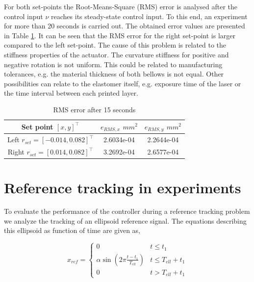 For both set-points the Root-Means-Square (RMS) error is analysed after the control input $\nu$ reaches its steady-state control input. To this end, an experiment for more than 20 seconds is carried out. The obtained error values are presented in Table \ref{tab:RMSerrors}. It can be seen that the RMS error for the right set-point is larger compared to the left set-point. The cause of this problem is related to the stiffness properties of the actuator. The curvature stiffness for positive and negative rotation is not uniform. This could be related to manufacturing tolerances, e.g. the material thickness of both bellows is not equal. Other possibilities can relate to the elastomer itself, e.g. exposure time of the laser or the time interval between each printed layer. 



\begin{table}[H]
    \centering
    \caption{RMS error after 15 seconds}
    \begin{tabular}{|c|c|c|} \hline
     Set point $[x,y]^\top$    & $e_{RMS,x}$ $mm^2$  &  $e_{RMS,y}$ $mm^2$  \\ \hline
    Left $r_{set}= [-0.014,0.082]^\top$     & 2.6034e-04  & 2.2644e-04 \\ \hline
    Right $r_{set}= [0.014,0.082]^\top$  &  3.2692e-04 &   2.6577e-04\\ \hline
    \end{tabular}
    \label{tab:RMSerrors}
\end{table}




\section{Reference tracking in experiments}

To evaluate the performance of the controller during a reference tracking problem we analyze the tracking of an ellipsoid reference signal. The equations describing this ellipsoid as function of time are given as,

\begin{equation}
    x_{ref} = \begin{cases} 
      0 &  t \leq t_1 \\
     \alpha \sin(2\pi \frac{t - t_1}{T_{ell}}) & t \leq T_{ell} + t_1 \\
     0 & t > T_{ell} + t_1
   \end{cases} 
\end{equation}

